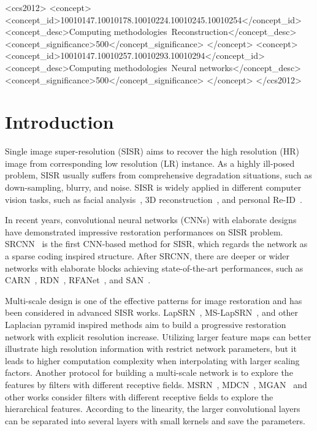 \documentclass[manuscript,screen]{acmart}
\begin{document}
\begin{CCSXML}
<ccs2012>
<concept>
<concept_id>10010147.10010178.10010224.10010245.10010254</concept_id>
<concept_desc>Computing methodologies~Reconstruction</concept_desc>
<concept_significance>500</concept_significance>
</concept>
<concept>
<concept_id>10010147.10010257.10010293.10010294</concept_id>
<concept_desc>Computing methodologies~Neural networks</concept_desc>
<concept_significance>500</concept_significance>
</concept>
</ccs2012>
\end{CCSXML}





\maketitle

\section{Introduction}
Single image super-resolution (SISR) aims to recover the high resolution (HR) image from corresponding low resolution (LR) instance. As a highly ill-posed problem, SISR usually suffers from comprehensive degradation situations, such as down-sampling, blurry, and noise. SISR is widely applied in different computer vision tasks, such as facial analysis~\cite{tomm_1}, 3D reconstruction~\cite{tomm_2}, and personal Re-ID~\cite{tomm_3}.

In recent years, convolutional neural networks (CNNs) with elaborate designs have demonstrated impressive restoration performances on SISR problem. SRCNN~\cite{srcnn_pami2016} is the first CNN-based method for SISR, which regards the network as a sparse coding inspired structure. After SRCNN, there are deeper or wider networks with elaborate blocks achieving state-of-the-art performances, such as CARN~\cite{carn_eccv2018}, RDN~\cite{rdn_pami2020}, RFANet~\cite{rfanet_cvpr2020}, and SAN~\cite{san_cvpr2019}. 

Multi-scale design is one of the effective patterns for image restoration and has been considered in advanced SISR works. LapSRN~\cite{lapsrn_cvpr2017}, MS-LapSRN~\cite{lapsrn_pami2019}, and other Laplacian pyramid inspired methods aim to build a progressive restoration network with explicit resolution increase. Utilizing larger feature maps can better illustrate high resolution information with restrict network parameters, but it leads to higher computation complexity when interpolating with larger scaling factors. Another protocol for building a multi-scale network is to explore the features by filters with different receptive fields. MSRN~\cite{msrn_eccv2018}, MDCN~\cite{mdcn_csvt2020}, MGAN~\cite{mgan_csvt2020} and other works consider filters with different receptive fields to explore the hierarchical features. According to the linearity, the larger convolutional layers can be separated into several layers with small kernels and save the parameters.
\end{document}
